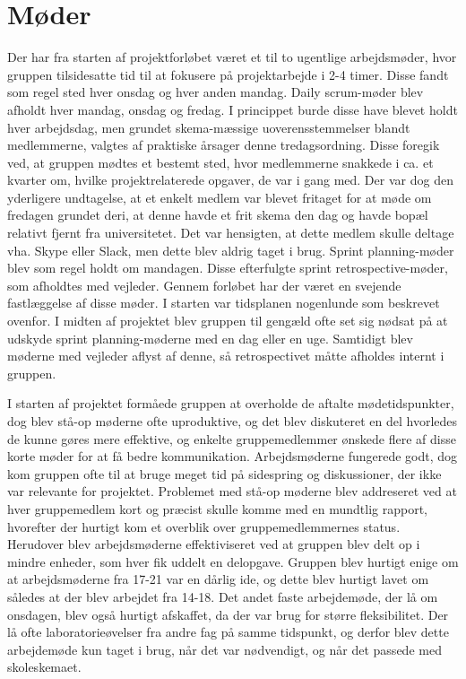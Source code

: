 \section{Møder}
Der har fra starten af projektforløbet været et til to ugentlige arbejdsmøder, hvor gruppen tilsidesatte tid til at fokusere på projektarbejde i 2-4 timer. Disse fandt som regel sted hver onsdag og hver anden mandag. Daily scrum-møder blev afholdt hver mandag, onsdag og fredag. I princippet burde disse have blevet holdt hver arbejdsdag, men grundet skema-mæssige uoverensstemmelser blandt medlemmerne, valgtes af praktiske årsager denne tredagsordning. Disse foregik ved, at gruppen
mødtes et bestemt sted, hvor medlemmerne snakkede i ca. et kvarter om, hvilke projektrelaterede opgaver, de var i gang med. Der var dog den yderligere undtagelse, at et enkelt medlem var blevet fritaget for at møde om fredagen grundet deri, at denne havde et frit skema den dag og havde bopæl relativt fjernt fra universitetet. Det var hensigten, at dette medlem skulle deltage vha. Skype eller Slack, men dette blev aldrig taget i brug. Sprint planning-møder blev som regel holdt om mandagen.
Disse efterfulgte sprint retrospective-møder, som afholdtes med vejleder. Gennem forløbet har der været en svejende fastlæggelse af disse møder. I starten var tidsplanen nogenlunde som beskrevet ovenfor. I midten af projektet blev gruppen til gengæld ofte set sig nødsat på at udskyde sprint planning-møderne med en dag eller en uge. Samtidigt blev møderne med vejleder aflyst af denne, så retrospectivet måtte afholdes internt i gruppen.

I starten af projektet formåede gruppen at overholde de aftalte mødetidspunkter, dog blev stå-op møderne ofte uproduktive, og det blev diskuteret en del hvorledes de kunne gøres mere effektive, og enkelte gruppemedlemmer ønskede flere af disse korte møder for at få bedre kommunikation. Arbejdsmøderne fungerede godt, dog kom gruppen ofte til at bruge meget tid på sidespring og diskussioner, der ikke var relevante for projektet. Problemet med stå-op møderne blev addreseret ved at hver gruppemedlem kort og præcist skulle komme med en mundtlig rapport, hvorefter der hurtigt kom et overblik over gruppemedlemmernes status. Herudover blev arbejdsmøderne effektiviseret ved at gruppen blev delt op i mindre enheder, som hver fik uddelt en delopgave. Gruppen blev hurtigt enige om at arbejdsmøderne fra 17-21 var en dårlig ide, og dette blev hurtigt lavet om således at der blev arbejdet fra 14-18. Det andet faste arbejdemøde, der lå om onsdagen, blev også hurtigt afskaffet, da der var brug for større fleksibilitet. Der lå ofte laboratorieøvelser fra andre fag på samme tidspunkt, og derfor blev dette arbejdemøde kun taget i brug, når det var nødvendigt, og når det passede med skoleskemaet.    

